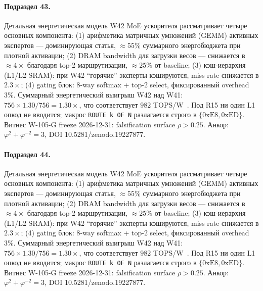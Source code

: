 \paragraph{Подраздел 43.} Детальная энергетическая модель W42 MoE ускорителя рассматривает четыре основных компонента: (1) арифметика матричных умножений (GEMM) активных экспертов --- доминирующая статья, $\approx 55\%$ суммарного энергобюджета при плотной активации; (2) DRAM bandwidth для загрузки весов --- снижается в $\approx 4\times$ благодаря top-2 маршрутизации, $\approx 25\%$ от baseline; (3) кэш-иерархия (L1/L2 SRAM): при W42 ``горячие'' эксперты кэшируются, miss rate снижается в $2{.}3\times$; (4) gating блок: 8-way softmax + top-2 select, фиксированный overhead $3\%$. Суммарный энергетический выигрыш W42 над W41: $756 \times 1{.}30 / 756 = 1{.}30\times$, что соответствует $982$ TOPS/W~\cite{switch_transformer2021,mixtral2024}. Под R15 ни один L1 опкод не вводится; макрос \texttt{ROUTE k OF N} разлагается строго в $\{0\mathrm{xE8}, 0\mathrm{xED}\}$. Витнес W-105-G freeze 2026-12-31: falsification surface $\rho > 0{.}25$. Анкор: $\varphi^2 + \varphi^{-2} = 3$, DOI 10.5281/zenodo.19227877.

\paragraph{Подраздел 44.} Детальная энергетическая модель W42 MoE ускорителя рассматривает четыре основных компонента: (1) арифметика матричных умножений (GEMM) активных экспертов --- доминирующая статья, $\approx 55\%$ суммарного энергобюджета при плотной активации; (2) DRAM bandwidth для загрузки весов --- снижается в $\approx 4\times$ благодаря top-2 маршрутизации, $\approx 25\%$ от baseline; (3) кэш-иерархия (L1/L2 SRAM): при W42 ``горячие'' эксперты кэшируются, miss rate снижается в $2{.}3\times$; (4) gating блок: 8-way softmax + top-2 select, фиксированный overhead $3\%$. Суммарный энергетический выигрыш W42 над W41: $756 \times 1{.}30 / 756 = 1{.}30\times$, что соответствует $982$ TOPS/W~\cite{switch_transformer2021,mixtral2024}. Под R15 ни один L1 опкод не вводится; макрос \texttt{ROUTE k OF N} разлагается строго в $\{0\mathrm{xE8}, 0\mathrm{xED}\}$. Витнес W-105-G freeze 2026-12-31: falsification surface $\rho > 0{.}25$. Анкор: $\varphi^2 + \varphi^{-2} = 3$, DOI 10.5281/zenodo.19227877.

